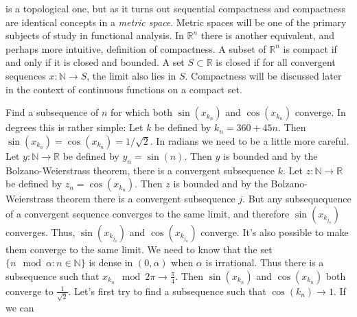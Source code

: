 \documentclass[crop=false,class=book,oneside]{standalone}
\begin{document}
            is a topological one, but as it turns out
            sequential compactness and compactness are
            identical concepts in a \textit{metric space}.
            Metric spaces will be one of the primary
            subjects of study in functional analysis.
            In $\mathbb{R}^{n}$ there is
            another equivalent, and perhaps more intuitive,
            definition of compactness. A subset of
            $\mathbb{R}^{n}$ is compact if and only if it
            is closed and bounded. A set $S\subset\mathbb{R}$
            is closed if for all convergent sequences
            $x:\mathbb{N}\rightarrow{S}$,
            the limit also lies in $S$.
            Compactness will be discussed later in the
            context of continuous functions on a compact set.
            \begin{example}
                Find a subsequence of $n$ for which
                both $\sin(x_{k_{n}})$ and $\cos(x_{k_{n}})$
                converge. In degrees
                this is rather simple: Let $k$ be defined by
                $k_{n}=360+45n$. Then
                $\sin(x_{k_n})=\cos(x_{k_{n}})=1/\sqrt{2}$.
                In radians we need to be a little more careful.
                Let $y:\mathbb{N}\rightarrow\mathbb{R}$
                be defined by $y_{n}=\sin(n)$.
                Then $y$ is bounded and
                by the Bolzano-Weierstrass theorem,
                there is a convergent subsequence $k$.
                Let $z:\mathbb{N}\rightarrow\mathbb{R}$
                be defined by $z_{n}=\cos(x_{k_{n}})$. Then $z$
                is bounded and by the
                Bolzano-Weierstrass theorem there is a
                convergent subsequence $j$. But
                any subsequequence of a convergent sequence
                converges to the same limit, and therefore
                $\sin(x_{k_{j_{n}}})$ converges. Thus,
                $\sin(x_{k_{j_{n}}})$ and
                $\cos(x_{k_{j_{n}}})$ converge. It's also
                possible to make them converge to the same
                limit. We need to know that the set
                $\{n\mod\alpha:n\in\mathbb{N}\}$ is dense
                in $(0,\alpha)$ when $\alpha$ is irrational.
                Thus there is a subsequence such that
                $x_{k_{n}}\mod2\pi\rightarrow{\frac{\pi}{4}}$.
                Then $\sin(x_{k_{n}})$ and $\cos(x_{k_{n}})$
                both converge to $\frac{1}{\sqrt{2}}$.
                Let's first try to find a subsequence such that
                $\cos(k_{n})\rightarrow{1}$. If we can

\end{example}
\end{document}
